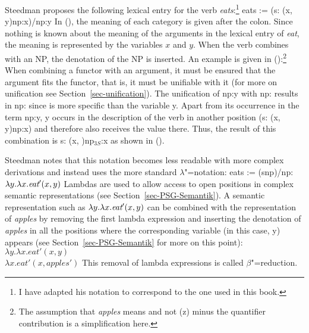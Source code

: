 Steedman proposes the following lexical entry for the verb \emph{eats}:\footnote{%
 I have adapted his notation to correspond to the one used in this book.
}
\ea
eats := (s: (x, y)\bs np:x)/np:y
\z
In (), the meaning of each category is given after the colon. Since nothing is known about
the meaning of the arguments in the lexical entry of \emph{eat},
the meaning is represented by the variables $x$ and $y$. When the verb combines with an NP, the denotation of the NP is inserted. An example is given in ():\footnote{%
The assumption that \emph{apples} means  and not (z) minus the quantifier contribution is a simplification here.
}
\ea
{}
\z
When combining a functor with an argument, it must be ensured that the argument fits the functor, that is, it must be unifiable with it
(for more on unification see Section~\ref{sec-unification}). The unification of np:y with np:  results in np:  since 
is more specific than the variable y. Apart from its occurrence in the term np:y, y occurs in the description of the verb in another position (s:
(x, y)\bs np:x) and therefore also receives the value 
there. Thus, the result of this combination is s: (x, )\bs np$_{3S}$:x 
as shown in ().

Steedman notes that this notation becomes less readable with more complex derivations and instead uses the more standard $\lambda$"=notation:
\ea
eats := (s\bs np)/np: $\lambda y.\lambda x.\textit{eat}'(x, y)$
\z
Lambdas are used to allow access to open positions in complex semantic representations (see Section~\ref{sec-PSG-Semantik}). A semantic representation such as
$\lambda
y.\lambda x.\textit{eat}'(x, y)$ can be combined with the representation of \emph{apples} by
removing the first lambda expression and inserting the denotation of \emph{apples}
in all the positions where the corresponding variable (in this case, y) appears (see Section~\ref{sec-PSG-Semantik} for more on this point):
\ea
$\lambda y.\lambda x.eat'(x, y)$ \\
$\lambda x.eat'(x, apples')$
\z
This removal of lambda expressions is called $\beta$"=reduction\label{Seite-beta-Reduktion}.


